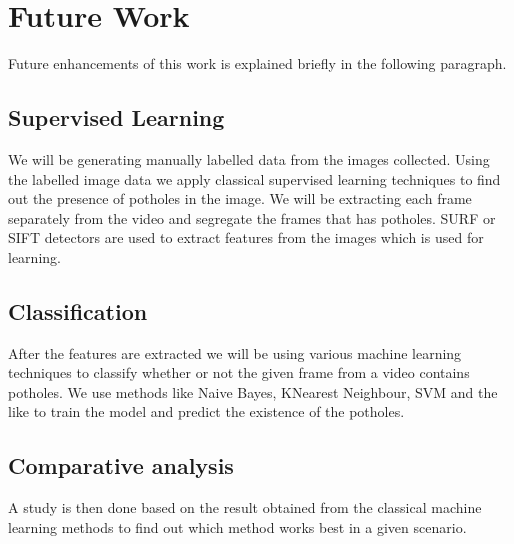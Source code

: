 \documentclass[12pt,a4paper]{article}
\begin{document}
\begin{itemize}
%
%    
\end{itemize}

\section{Future Work}
Future enhancements of this work is explained briefly in the following paragraph.


\subsection{Supervised Learning}
We will be generating manually labelled data from the images collected. Using the labelled image data we apply classical supervised learning techniques to find out the presence of potholes in the image. We will be extracting each frame separately from the video and segregate the frames that has potholes. SURF or SIFT detectors are used to extract features from the images which is used for learning. 

\subsection{Classification}
After the features are extracted we will be using various machine learning techniques to classify whether or not the given frame from a video contains potholes. We use methods like Naive Bayes, KNearest Neighbour, SVM and the like to train the model and predict the existence of the potholes.


\subsection{Comparative analysis}
A study is then done based on the result obtained from the classical machine learning methods to find out which method works best in a given scenario.
\end{document}
